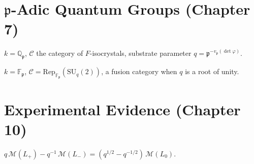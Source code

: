 \chapter{\texorpdfstring{$\mathfrak{p}$}{p}-Adic Quantum Groups (Chapter 7)}

\begin{definition}
  \label{def:p-adic-realisation}
  $k = \mathbb{Q}_\mathfrak{p}$, $\mathcal{C}$ the category of
  $F$-isocrystals, substrate parameter
  $q = \mathfrak{p}^{-v_\mathfrak{p}(\det\varphi)}$.
\end{definition}

\begin{definition}
  \label{def:finite-field-realisation}
  $k = \mathbb{F}_\mathfrak{p}$, $\mathcal{C} =
  \mathrm{Rep}_{\mathbb{F}_\mathfrak{p}}(\mathrm{SU}_q(2))$,
  a fusion category when $q$ is a root of unity.
\end{definition}


\chapter{Experimental Evidence (Chapter 10)}

\begin{definition}
  \label{def:skein-mass-relation}
  $q\,\mathcal{M}(L_+) - q^{-1}\,\mathcal{M}(L_-)
  = (q^{1/2} - q^{-1/2})\,\mathcal{M}(L_0)$.
\end{definition}
